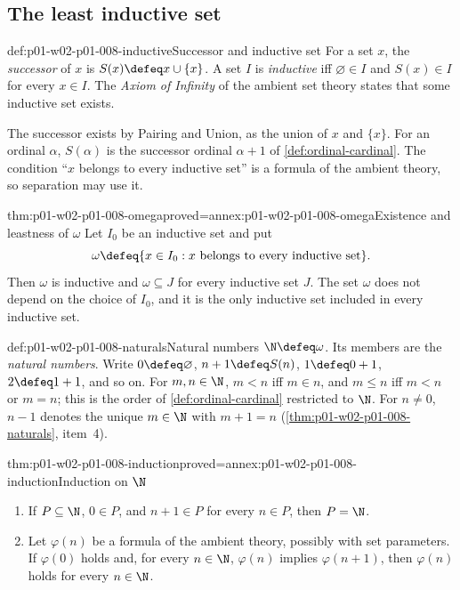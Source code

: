 \subsection{The least inductive set}
\label{sec:p01-w02-p01-008-omega}

\begin{hbdefinition}{def:p01-w02-p01-008-inductive}{Successor and inductive set}
For a set \(x\), the \emph{successor} of \(x\) is \(S(x)\defeq x\cup\{x\}\).
A set \(I\) is \emph{inductive} iff \(\varnothing\in I\) and \(S(x)\in I\)
for every \(x\in I\). The \emph{Axiom of Infinity} of the ambient set theory
states that some inductive set exists.
\end{hbdefinition}

The successor exists by Pairing and Union, as the union of \(x\) and
\(\{x\}\). For an ordinal \(\alpha\), \(S(\alpha)\) is the successor ordinal
\(\alpha+1\) of \cref{def:ordinal-cardinal}. The condition ``\(x\) belongs
to every inductive set'' is a formula of the ambient theory, so separation
may use it.

\begin{hbtheorem}{thm:p01-w02-p01-008-omega}{proved=annex:p01-w02-p01-008-omega}{Existence and leastness of \(\omega\)}
Let \(I_0\) be an inductive set and put
\[
  \omega\defeq\{x\in I_0:x\text{ belongs to every inductive set}\}.
\]
Then \(\omega\) is inductive and \(\omega\subseteq J\) for every inductive
set \(J\). The set \(\omega\) does not depend on the choice of \(I_0\), and it
is the only inductive set included in every inductive set.
\end{hbtheorem}

\begin{hbconvention}{def:p01-w02-p01-008-naturals}{Natural numbers}
\(\N\defeq\omega\). Its members are the \emph{natural numbers}. Write
\(0\defeq\varnothing\), \(n+1\defeq S(n)\), \(1\defeq0+1\),
\(2\defeq1+1\), and so on. For \(m,n\in\N\), \(m<n\) iff \(m\in n\), and
\(m\leq n\) iff \(m<n\) or \(m=n\); this is the order of
\cref{def:ordinal-cardinal} restricted to \(\N\). For \(n\neq0\), \(n-1\)
denotes the unique \(m\in\N\) with \(m+1=n\)
(\cref{thm:p01-w02-p01-008-naturals}, item~4).
\end{hbconvention}

\begin{hbtheorem}{thm:p01-w02-p01-008-induction}{proved=annex:p01-w02-p01-008-induction}{Induction on \(\N\)}
\begin{enumerate}
  \item If \(P\subseteq\N\), \(0\in P\), and \(n+1\in P\) for every
        \(n\in P\), then \(P=\N\).
  \item Let \(\varphi(n)\) be a formula of the ambient theory, possibly with
        set parameters. If \(\varphi(0)\) holds and, for every \(n\in\N\),
        \(\varphi(n)\) implies \(\varphi(n+1)\), then \(\varphi(n)\) holds
        for every \(n\in\N\).
\end{enumerate}
\end{hbtheorem}

